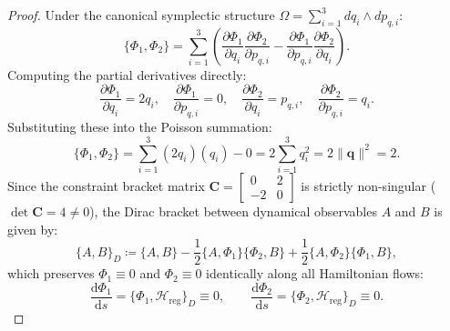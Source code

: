 \documentclass[11pt,a4paper,reqno]{article}
\theoremstyle{plain}
\theoremstyle{definition}
\theoremstyle{remark}
\numberwithin{equation}{section}
\begin{document}
\begin{proof}
Under the canonical symplectic structure $\Omega = \sum_{i=1}^3 dq_i \wedge dp_{q,i}$:
\begin{equation}
  \{\Phi_1, \Phi_2\} = \sum_{i=1}^3 \left( \frac{\partial \Phi_1}{\partial q_i} \frac{\partial \Phi_2}{\partial p_{q,i}} - \frac{\partial \Phi_1}{\partial p_{q,i}} \frac{\partial \Phi_2}{\partial q_i} \right).
\end{equation}
Computing the partial derivatives directly:
\begin{equation}
  \frac{\partial \Phi_1}{\partial q_i} = 2 q_i, \quad \frac{\partial \Phi_1}{\partial p_{q,i}} = 0, \quad \frac{\partial \Phi_2}{\partial q_i} = p_{q,i}, \quad \frac{\partial \Phi_2}{\partial p_{q,i}} = q_i.
\end{equation}
Substituting these into the Poisson summation:
\begin{equation}
  \{\Phi_1, \Phi_2\} = \sum_{i=1}^3 (2 q_i)(q_i) - 0 = 2 \sum_{i=1}^3 q_i^2 = 2 \|\bm{q}\|^2 = 2.
\end{equation}
Since the constraint bracket matrix $\mathbf{C} = \begin{bmatrix} 0 & 2 \\ -2 & 0 \end{bmatrix}$ is strictly non-singular ($\det \mathbf{C} = 4 \ne 0$), the Dirac bracket between dynamical observables $A$ and $B$ is given by:
\begin{equation}
  \{A, B\}_D \coloneqq \{A, B\} - \frac{1}{2} \{A, \Phi_1\} \{\Phi_2, B\} + \frac{1}{2} \{A, \Phi_2\} \{\Phi_1, B\},
\end{equation}
which preserves $\Phi_1 \equiv 0$ and $\Phi_2 \equiv 0$ identically along all Hamiltonian flows:
\begin{equation}
  \frac{\mathrm{d}\Phi_1}{\mathrm{d}s} = \{\Phi_1, \mathcal{H}_{\mathrm{reg}}\}_D \equiv 0, \qquad \frac{\mathrm{d}\Phi_2}{\mathrm{d}s} = \{\Phi_2, \mathcal{H}_{\mathrm{reg}}\}_D \equiv 0.
\end{equation}
\end{proof}
\end{document}
